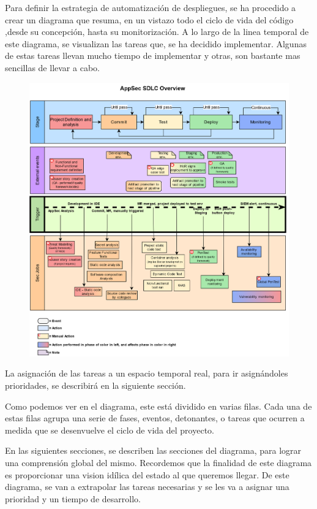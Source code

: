 \documentclass[12pt]{report} %
\begin{document}
Para definir la estrategia de automatización de despliegues, se ha procedido a
crear un diagrama que resuma, en un vistazo todo el ciclo de vida del código
,desde su concepción, hasta su monitorización.
A lo largo de la linea temporal de este diagrama, se visualizan las tareas que,
se ha decidido implementar.
Algunas de estas tareas llevan mucho tiempo de implementar y otras, son bastante
mas sencillas de llevar a cabo.

\begin{figure}[H] \includegraphics[width=\textwidth]{SDLC-Sec} \end{figure}

La asignación de las tareas a un espacio temporal real, para ir asignándoles
prioridades, se describirá en la siguiente sección.

Como podemos ver en el diagrama, este está dividido en varias filas.
Cada una de estas filas agrupa una serie de fases, eventos, detonantes, o tareas
que ocurren a medida que se desenvuelve el ciclo de vida del proyecto.

En las siguientes secciones, se describen las secciones del diagrama, para lograr
una comprensión global del mismo.
Recordemos que la finalidad de este diagrama es proporcionar una vision idílica
del estado al que queremos llegar.
De este diagrama, se van a extrapolar las tareas necesarias y se les va a
asignar una prioridad y un tiempo de desarrollo. 
\end{document}

